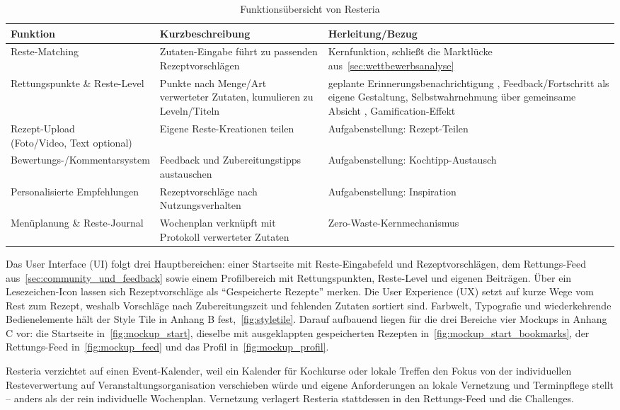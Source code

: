 \begin{table}[H]
\caption{Funktionsübersicht von Resteria}\label{tab:funktionsuebersicht}
{\footnotesize
\begin{tabularx}{\textwidth}{@{}l X X@{}}
\toprule
\textbf{Funktion} & \textbf{Kurzbeschreibung} & \textbf{Herleitung/Bezug} \\
\midrule
Reste-Matching & Zutaten-Eingabe führt zu passenden Rezeptvorschlägen & Kernfunktion, schließt die Marktlücke aus~\autoref{sec:wettbewerbsanalyse} \\
Rettungspunkte \& Reste-Level & Punkte nach Menge/Art verwerteter Zutaten, kumulieren zu Leveln/Titeln & geplante Erinnerungsbenachrichtigung \parencite[S. 10]{barkerWhatNudgeTechniques2021}, Feedback/Fortschritt als eigene Gestaltung, Selbstwahrnehmung über gemeinsame Absicht \parencite[S. 14]{nivedhithaHowGreenSocial2024}, Gamification-Effekt \parencite[S. 9]{somaFoodWasteReduction2020} \\
\shortstack[l]{Rezept-Upload\\(Foto/Video, Text optional)} & Eigene Reste-Kreationen teilen & Aufgabenstellung: Rezept-Teilen \\
Bewertungs-/Kommentarsystem & Feedback und Zubereitungstipps austauschen & Aufgabenstellung: Kochtipp-Austausch \\
Personalisierte Empfehlungen & Rezeptvorschläge nach Nutzungsverhalten & Aufgabenstellung: Inspiration \\
Menüplanung \& Reste-Journal & Wochenplan verknüpft mit Protokoll verwerteter Zutaten & Zero-Waste-Kernmechanismus \\
\bottomrule
\end{tabularx}
}
\end{table}

Das User Interface (UI) folgt drei Hauptbereichen: einer Startseite mit Reste-Eingabefeld und Rezeptvorschlägen, dem Rettungs-Feed aus~\autoref{sec:community_und_feedback} sowie einem Profilbereich mit Rettungspunkten, Reste-Level und eigenen Beiträgen. Über ein Lesezeichen-Icon lassen sich Rezeptvorschläge als \enquote{Gespeicherte Rezepte} merken. Die User Experience (UX) setzt auf kurze Wege vom Rest zum Rezept, weshalb Vorschläge nach Zubereitungszeit und fehlenden Zutaten sortiert sind. Farbwelt, Typografie und wiederkehrende Bedienelemente hält der Style Tile in Anhang B fest,~\autoref{fig:styletile}. Darauf aufbauend liegen für die drei Bereiche vier Mockups in Anhang C vor: die Startseite in~\autoref{fig:mockup_start}, dieselbe mit ausgeklappten gespeicherten Rezepten in~\autoref{fig:mockup_start_bookmarks}, der Rettungs-Feed in~\autoref{fig:mockup_feed} und das Profil in~\autoref{fig:mockup_profil}.

Resteria verzichtet auf einen Event-Kalender, weil ein Kalender für Kochkurse oder lokale Treffen den Fokus von der individuellen Resteverwertung auf Veranstaltungsorganisation verschieben würde und eigene Anforderungen an lokale Vernetzung und Terminpflege stellt – anders als der rein individuelle Wochenplan. Vernetzung verlagert Resteria stattdessen in den Rettungs-Feed und die Challenges.
